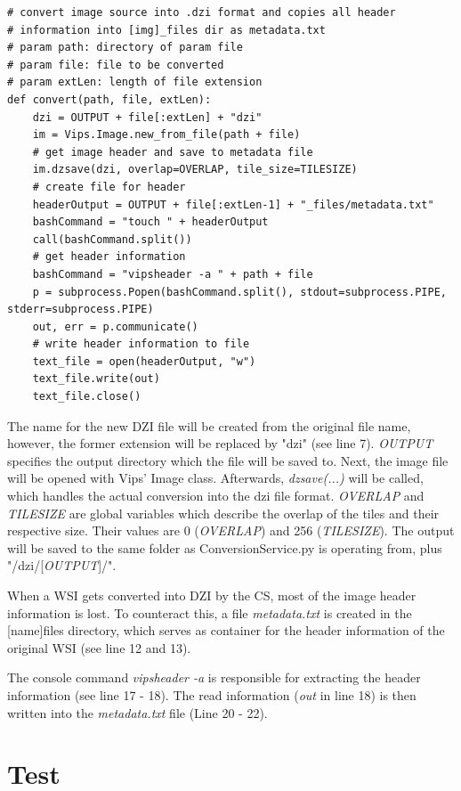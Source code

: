 \begin{lstlisting}[frame=single]
# convert image source into .dzi format and copies all header 
# information into [img]_files dir as metadata.txt
# param path: directory of param file
# param file: file to be converted
# param extLen: length of file extension
def convert(path, file, extLen):
	dzi = OUTPUT + file[:extLen] + "dzi"
	im = Vips.Image.new_from_file(path + file)
	# get image header and save to metadata file
	im.dzsave(dzi, overlap=OVERLAP, tile_size=TILESIZE)
	# create file for header
	headerOutput = OUTPUT + file[:extLen-1] + "_files/metadata.txt"
	bashCommand = "touch " + headerOutput
	call(bashCommand.split())
	# get header information
	bashCommand = "vipsheader -a " + path + file
	p = subprocess.Popen(bashCommand.split(), stdout=subprocess.PIPE, stderr=subprocess.PIPE)
	out, err = p.communicate()
	# write header information to file
	text_file = open(headerOutput, "w")
	text_file.write(out)
	text_file.close()
\end{lstlisting}

The name for the new DZI file will be created from the original file name, however, the former extension will be replaced by "dzi" (see line 7). \emph{OUTPUT} specifies the output directory which the file will be saved to. Next, the image file will be opened with Vips' Image class. Afterwards, \emph{dzsave(...)} will be called, which handles the actual conversion into the dzi file format. \emph{OVERLAP} and \emph{TILESIZE} are global variables which describe the overlap of the tiles and their respective size. Their values are 0 (\emph{OVERLAP}) and 256 (\emph{TILESIZE}). The output will be saved to the same folder as ConversionService.py is operating from, plus "/dzi/[\emph{OUTPUT}]/".

When a WSI gets converted into DZI by the CS, most of the image header information is lost. To counteract this, a file \emph{metadata.txt} is created in the [name]{\textunderscore}files directory, which serves as container for the header information of the original WSI (see line 12 and 13).

The console command \emph{vipsheader -a} is responsible for extracting the header information (see line 17 - 18). The read information (\emph{out} in line 18) is then written into the \emph{metadata.txt} file (Line 20 - 22).


\section{Test}

